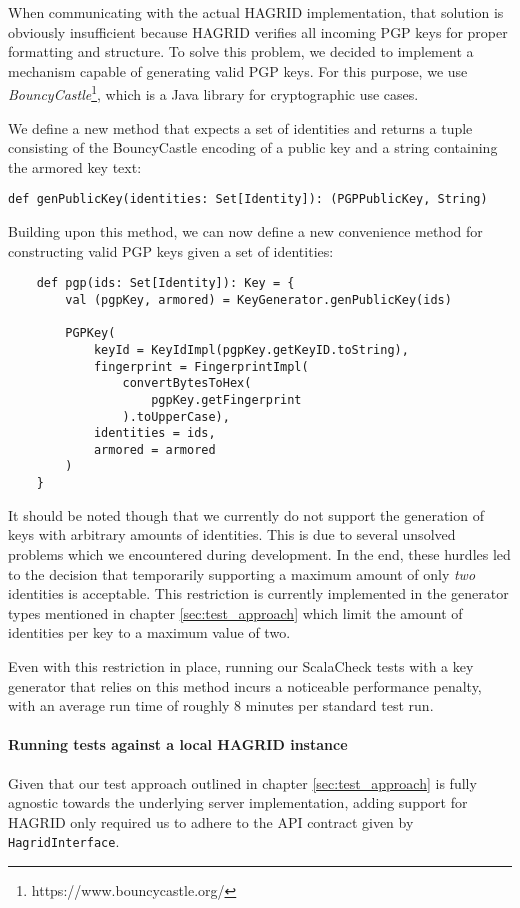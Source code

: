 When communicating with the actual HAGRID implementation, that solution is obviously insufficient because HAGRID verifies all incoming PGP keys for proper formatting and structure. To solve this problem, we decided to implement a mechanism capable of generating valid PGP keys. 
For this purpose, we use \emph{BouncyCastle}\footnote{https://www.bouncycastle.org/}, which is a Java library for cryptographic use cases.

We define a new method that expects a set of identities and returns a tuple consisting of the BouncyCastle encoding of a public key and a string containing the armored key text:
\begin{verbatim}
def genPublicKey(identities: Set[Identity]): (PGPPublicKey, String)
\end{verbatim}

Building upon this method, we can now define a new convenience method for constructing valid PGP keys given a set of identities: 
\begin{code}
    \begin{verbatim}
    def pgp(ids: Set[Identity]): Key = {
        val (pgpKey, armored) = KeyGenerator.genPublicKey(ids)
    
        PGPKey(
            keyId = KeyIdImpl(pgpKey.getKeyID.toString),
            fingerprint = FingerprintImpl(
                convertBytesToHex(
                    pgpKey.getFingerprint
                ).toUpperCase),
            identities = ids,
            armored = armored
        )
    }
    \end{verbatim}
\end{code}
It should be noted though that we currently do not support the generation of keys with arbitrary amounts of identities. This is due to several unsolved problems which we encountered during development. In the end, these hurdles led to the decision that temporarily supporting a maximum amount of only \emph{two} identities is acceptable. This restriction is currently implemented in the generator types mentioned in chapter \ref{sec:test_approach} which limit the amount of identities per key to a maximum value of two. 

Even with this restriction in place, running our ScalaCheck tests with a key generator that relies on this method incurs a noticeable performance penalty, with an average run time of roughly 8 minutes per standard test run.

\paragraph{Running tests against a local HAGRID instance} Given that our test approach outlined in chapter \ref{sec:test_approach} is fully agnostic towards the underlying server implementation, adding support for HAGRID only required us to adhere to the API contract given by \texttt{HagridInterface}.
